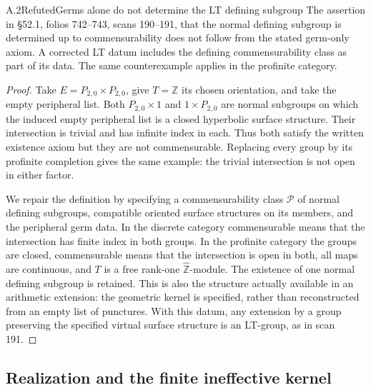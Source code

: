 \begin{statement}{A.2}{Refuted}{Germs alone do not determine the LT defining subgroup}
The assertion in \S52.1, folios 742--743, scans 190--191, that the
normal defining subgroup is determined up to commensurability does not
follow from the stated germ-only axiom. A corrected LT datum includes
the defining commensurability class as part of its data. The same
counterexample applies in the profinite category.
\end{statement}
\begin{proof}
Take $E=P_{2,0}\times P_{2,0}$, give $T=\mathbb Z$ its chosen orientation,
and take the empty peripheral list. Both
$P_{2,0}\times1$ and $1\times P_{2,0}$ are normal subgroups on which the
induced empty peripheral list is a closed hyperbolic surface structure.
Their intersection is trivial and has infinite index in each. Thus both
satisfy the written existence axiom but they are not commensurable.
Replacing every group by its profinite completion gives the same
example: the trivial intersection is not open in either factor.

We repair the definition by specifying a commensurability class
$\mathscr P$ of normal defining subgroups, compatible oriented surface
structures on its members, and the peripheral germ data. In the
discrete category commensurable means that the intersection has finite
index in both groups. In the profinite category the groups are closed,
commensurable means that the intersection is open in both, all maps are
continuous, and $T$ is a free rank-one $\widehat{\mathbb Z}$-module.
The existence of one normal defining subgroup is retained. This is
also the structure actually available in an arithmetic extension:
the geometric kernel is specified, rather than reconstructed from an
empty list of punctures. With this datum, any extension by a group
preserving the specified virtual surface structure is an LT-group,
as in scan 191.
\end{proof}

\subsection{Realization and the finite ineffective kernel}

